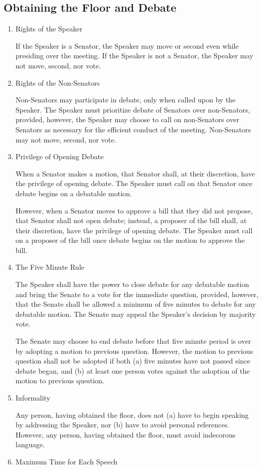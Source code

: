 \documentclass[12pt]{scrreprt}
\begin{document}
\subsection{Obtaining the Floor and Debate}
\begin{enumerate}
    \item Rights of the Speaker

If the Speaker is a Senator, the Speaker may move or second even while presiding over the
meeting. If the Speaker is not a Senator, the Speaker may not move, second, nor vote.
    \item Rights of the Non-Senators
    
Non-Senators may participate in debate, only when called upon by the Speaker. The Speaker
must prioritize debate of Senators over non-Senators, provided, however, the Speaker may
choose to call on non-Senators over Senators as necessary for the efficient conduct of the
meeting. Non-Senators may not move, second, nor vote.
    \item Privilege of Opening Debate
    
When a Senator makes a motion, that Senator shall, at their discretion, have the privilege of
opening debate. The Speaker must call on that Senator once debate begins on a debatable
motion.

However, when a Senator moves to approve a bill that they did not propose, that Senator shall
not open debate; instead, a proposer of the bill shall, at their discretion, have the privilege of
opening debate. The Speaker must call on a proposer of the bill once debate begins on the
motion to approve the bill.
    \item The Five Minute Rule
    
The Speaker shall have the power to close debate for any debatable motion and bring the
Senate to a vote for the immediate question, provided, however, that the Senate shall be
allowed a minimum of five minutes to debate for any debatable motion. The Senate may appeal
the Speaker’s decision by majority vote.


The Senate may choose to end debate before that five minute period is over by adopting a
motion to previous question. However, the motion to previous question shall not be adopted if
both (a) five minutes have not passed since debate began, and (b) at least one person votes
against the adoption of the motion to previous question.
    \item Informality 

Any person, having obtained the floor, does not (a) have to begin speaking by addressing the
Speaker, nor (b) have to avoid personal references. However, any person, having obtained the
floor, must avoid indecorous language.
    \item Maximum Time for Each Speech
    

\end{enumerate}
\end{document}
